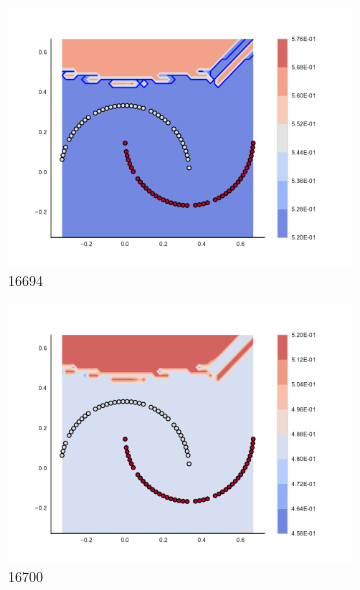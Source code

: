 \begin{figure}[h]
\begin{subfigure}[b]{0.09\textwidth}
    \includegraphics[clip, trim=2.35cm 1.75cm 4.5cm 0cm,width=\textwidth]{img/convergence/16694.pdf}
    \caption{16694}
    \label{fig:convergence_16694}
\end{subfigure}
%
\begin{subfigure}[b]{0.09\textwidth}
    \includegraphics[clip, trim=2.35cm 1.75cm 4.5cm 0cm,width=\textwidth]{img/convergence/16700.pdf}
    \caption{16700}
    \label{fig:convergence_16700}
\end{subfigure}
%
\begin{subfigure}[b]{0.09\textwidth}

\end{subfigure}
\end{figure}
